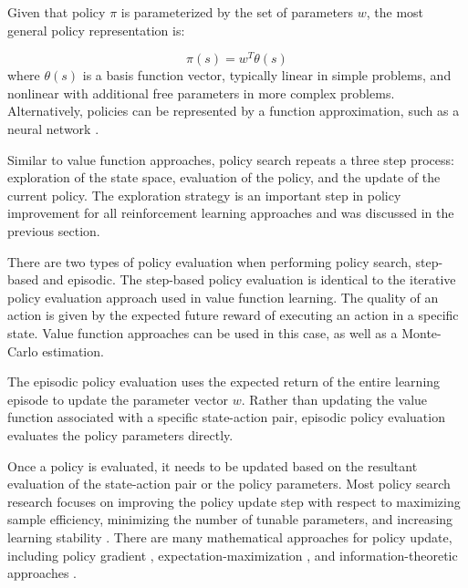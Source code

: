 \documentclass{article}
\begin{document}
Given that policy $\pi$ is parameterized by the set of parameters $w$, the most general policy representation is: 

\begin{equation}
\pi(s) = w^T \theta(s)
\end{equation}
where $\theta(s)$ is a basis function vector, typically linear in simple problems, and nonlinear with additional free parameters in more complex problems. Alternatively, policies can be represented by a function approximation, such as a neural network \cite{Heidrich-Meisner:2009:NSE:1645448.1645634}. 

Similar to value function approaches, policy search repeats a three step process: exploration of the state space, evaluation of the policy, and the update of the current policy. The exploration strategy is an important step in policy improvement for all reinforcement learning approaches and was discussed in the previous section.  

There are two types of policy evaluation when performing policy search, step-based and episodic. The step-based policy evaluation is identical to the iterative policy evaluation approach used in value function learning. The quality of an action is given by the expected future reward of executing an action in a specific state. Value function approaches can be used in this case, as well as a Monte-Carlo estimation. %

The episodic policy evaluation uses the expected return of the entire learning episode to update the parameter vector $w$. Rather than updating the value function associated with a specific state-action pair, episodic policy evaluation evaluates the policy parameters directly. %

Once a policy is evaluated, it needs to be updated based on the resultant evaluation of the state-action pair or the policy parameters. Most policy search research focuses on improving the policy update step with respect to maximizing sample efficiency, minimizing the number of tunable parameters, and increasing learning stability \cite{journals/ftrob/DeisenrothNP13}. There are many mathematical approaches for policy update, including policy gradient \cite{Baxter99directgradient-based, kohl:icra04, 4058714, Shu:2006:NCL:1666642.1666764,Williams92simplestatistical}, expectation-maximization \cite{Kober:2011:PSM:2004157.2004158, conf/icml/Neumann11}, and information-theoretic approaches \cite{DanielAISTATS2012, Peters+MA:2010}.
\end{document}
